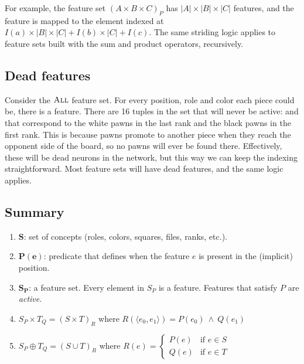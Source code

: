 For example, the feature set $(A \times B \times C)_{P}$ has $|A| \times |B| \times |C|$ features, and the feature  is mapped to the element indexed at $I(a) \times |B| \times |C| + I(b) \times |C| + I(c)$. The same striding logic applies to feature sets built with the sum and product operators, recursively.

\subsection{Dead features}

Consider the $\textsc{All}$ feature set. For every position, role and color each piece could be, there is a feature. There are 16 tuples in the set that will never be active:  and  that correspond to the white pawns in the last rank and the black pawns in the first rank. This is because pawns promote to another piece when they reach the opponent side of the board, so no pawns will ever be found there. Effectively, these will be dead neurons in the network, but this way we can keep the indexing straightforward. Most feature sets will have dead features, and the same logic applies.

\subsection{Summary}

\begin{enumerate}
\item $\bm S$: set of concepts (roles, colors, squares, files, ranks, etc.).
\item $\bm{P(e)}$: predicate that defines when the feature $e$ is present in the (implicit) position.
\item ${\bm S}_{\bm P}$: a feature set. Every element in $S_P$ is a feature. Features that satisfy $P$ are \textit{active}.
\item $S_P \times T_Q={(S \times T)}_{R}$ where $R(\langle e_0, e_1 \rangle) = P(e_0)\ \land\ Q(e_1)$
\item $S_P \oplus T_Q={(S \cup T)}_R$ where $R(e) = \begin{cases}
        P(e) & \text{if } e \in S \\
        Q(e) & \text{if } e \in T
    \end{cases}
$

\end{enumerate}

